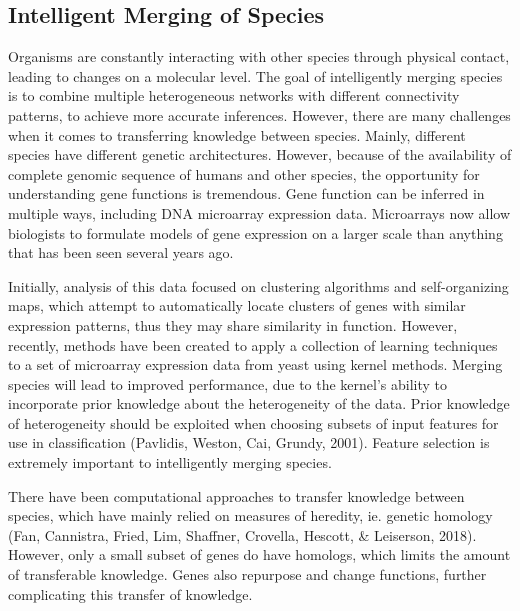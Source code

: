 \subsection{Intelligent Merging of Species} %
Organisms are constantly interacting with other species through physical contact, leading to changes on a molecular level. The goal of intelligently merging species is to combine multiple heterogeneous networks with different connectivity patterns, to achieve more accurate inferences. However, there are many challenges when it comes to transferring knowledge between species. Mainly, different species have different genetic architectures. However, because of the availability of complete genomic sequence of humans and other species, the opportunity for understanding gene functions is tremendous. Gene function can be inferred in multiple ways, including DNA microarray expression data. Microarrays now allow biologists to formulate models of gene expression on a larger scale than anything that has been seen several years ago. 

Initially, analysis of this data focused on clustering algorithms and self-organizing maps, which attempt to automatically locate clusters of genes with similar expression patterns, thus they may share similarity in function. However, recently, methods have been created to apply a collection of learning techniques to a set of microarray expression data from yeast using kernel methods. Merging species will lead to improved performance, due to the kernel’s ability to incorporate prior knowledge about the heterogeneity of the data. Prior knowledge of heterogeneity should be exploited when choosing subsets of input features for use in classification (Pavlidis, Weston, Cai, Grundy, 2001). Feature selection is extremely important to intelligently merging species. 

There have been computational approaches to transfer knowledge between species, which have mainly relied on measures of heredity, ie. genetic homology (Fan, Cannistra, Fried, Lim, Shaffner, Crovella, Hescott, \& Leiserson, 2018). However, only a small subset of genes do have homologs, which limits the amount of transferable knowledge. Genes also repurpose and change functions, further complicating this transfer of knowledge. 

